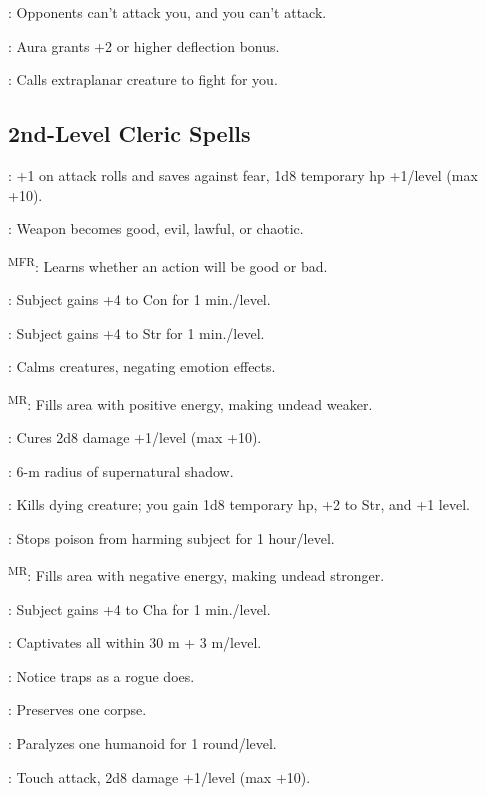 : Opponents can't attack you, and you can't attack.

: Aura grants +2 or higher deflection bonus.

: Calls extraplanar creature to fight for you.



\subsection{2nd-Level Cleric Spells}

: +1 on attack rolls and saves against fear, 1d8 temporary hp +1/level (max +10).

: Weapon becomes good, evil, lawful, or chaotic.

\textsuperscript{MFR}: Learns whether an action will be good or bad.

: Subject gains +4 to Con for 1 min./level.

: Subject gains +4 to Str for 1 min./level.

: Calms creatures, negating emotion effects.

\textsuperscript{MR}: Fills area with positive energy, making undead weaker.

: Cures 2d8 damage +1/level (max +10).

: 6-m radius of supernatural shadow.

: Kills dying creature; you gain 1d8 temporary hp, +2 to Str, and +1 level.

: Stops poison from harming subject for 1 hour/level.

\textsuperscript{MR}: Fills area with negative energy, making undead stronger.

: Subject gains +4 to Cha for 1 min./level.

: Captivates all within 30 m + 3 m/level.

: Notice traps as a rogue does.

: Preserves one corpse.

: Paralyzes one humanoid for 1 round/level.

: Touch attack, 2d8 damage +1/level (max +10).

